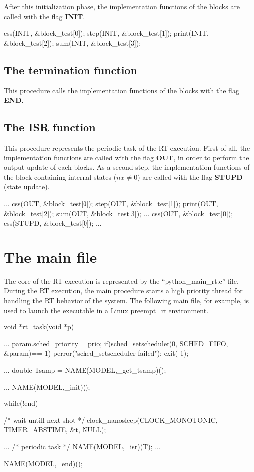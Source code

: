 After this initialization phase, the implementation functions of the blocks are 
called with the 
flag \textbf{INIT}.

\begin{code}
  css(INIT, &block_test[0]);
  step(INIT, &block_test[1]);
  print(INIT, &block_test[2]);
  sum(INIT, &block_test[3]);
\end{code}

\subsection{The termination function}
This procedure calls the implementation functions of the blocks with the flag 
\textbf{END}.

\subsection{The ISR function}
This procedure represents the periodic task of the RT execution. First of all, 
the implementation functions are called with the flag \textbf{OUT}, in order to 
perform the output update of each blocks. As a second step, the implementation 
functions of the block containing internal states ($nx \neq 0$) are called with 
the flag \textbf{STUPD} (state update).

\begin{code}
  ...
  css(OUT, &block_test[0]);
  step(OUT, &block_test[1]);
  print(OUT, &block_test[2]);
  sum(OUT, &block_test[3]);
  ...
  css(OUT, &block_test[0]);
  css(STUPD, &block_test[0]);
  ...
\end{code}

\section{The main file}

The core of the RT execution is represented by the ``python\_main\_rt.c'' file. 
During the RT execution, the main procedure starts a high priority thread for 
handling the RT behavior of the system. 
The following main file, for example, is used to launch the executable
in a Linux preempt\_rt environment.

\begin{code}
void *rt_task(void *p)
{
  ...
  param.sched_priority = prio;
  if(sched_setscheduler(0, SCHED_FIFO, &param)==-1){
    perror("sched_setscheduler failed");
    exit(-1);
  }

  ...
  double Tsamp = NAME(MODEL,_get_tsamp)();

  ...
  NAME(MODEL,_init)();

  while(!end){
   /* wait untill next shot */
    clock_nanosleep(CLOCK_MONOTONIC, 
                    TIMER_ABSTIME, &t, NULL);

    ...
    /* periodic task */
    NAME(MODEL,_isr)(T);
    ...
  }
  NAME(MODEL,_end)();  
}
\end{code}

